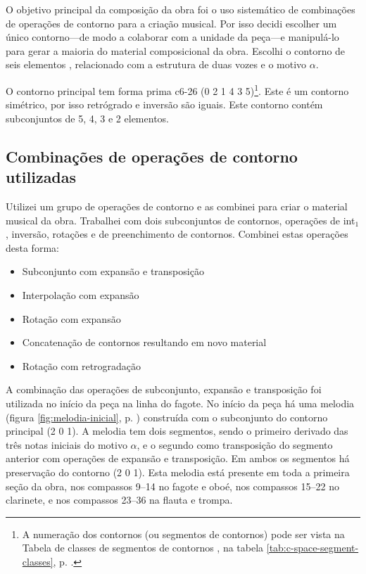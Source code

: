 O objetivo principal da composição da obra \obra{} foi o uso
sistemático de combinações de operações de contorno para a criação
musical. Por isso decidi escolher um único contorno---de modo a
colaborar com a unidade da peça---e manipulá-lo para gerar a maioria
do material composicional da obra. Escolhi o contorno de seis
elementos \contpr{}, relacionado com a estrutura de duas vozes e o
motivo $\alpha$.

O contorno principal \contpr{} tem forma prima c6-26 (0 2 1 4 3
5)\footnote{A numeração dos contornos (ou segmentos de contornos) pode
  ser vista na Tabela de classes de segmentos de contornos
  \cite{marvin.ea87:relating}, na tabela
  \ref{tab:c-space-segment-classes},
  p. \pageref{tab:c-space-segment-classes}.}. Este é um contorno
simétrico, por isso retrógrado e inversão são iguais. Este contorno
contém subconjuntos de 5, 4, 3 e 2 elementos.

\subsection{Combinações de operações de contorno utilizadas}
\label{sec:comb-de-oper}

Utilizei um grupo de operações de contorno e as combinei para criar o
material musical da obra. Trabalhei com dois subconjuntos de
contornos, operações de int$_1$, inversão, rotações e de preenchimento
de contornos. Combinei estas operações desta forma:

\begin{itemize}
\item Subconjunto com expansão e transposição
\item Interpolação com expansão
\item Rotação com expansão
\item Concatenação de contornos resultando em novo material
\item Rotação com retrogradação
\end{itemize}

A combinação das operações de subconjunto, expansão e transposição foi
utilizada no início da peça na linha do fagote. No início da peça há
uma melodia (figura \ref{fig:melodia-inicial},
p. \pageref{fig:melodia-inicial}) construída com o subconjunto do
contorno principal (2 0 1). A melodia tem dois segmentos, sendo o
primeiro derivado das três notas iniciais do motivo $\alpha$, e o
segundo como transposição do segmento anterior com operações de
expansão e transposição. Em ambos os segmentos há preservação do
contorno (2 0 1). Esta melodia está presente em toda a primeira seção
da obra, nos compassos 9--14 no fagote e oboé, nos compassos 15--22 no
clarinete, e nos compassos 23--36 na flauta e trompa.

